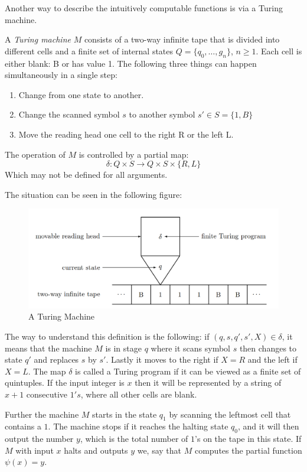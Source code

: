 \documentclass[../main.tex]{subfiles}
\begin{document}
Another way to describe the intuitively computable functions is via a Turing
machine. 
\begin{defi}
	A \textit{Turing machine} $M$ consists of a two-way infinite tape that
	is divided into different cells and a finite set of internal states $Q=\{
	q_0,\ldots, g_n\}$, $n\geq 1$. Each cell  is either blank: B or has
	value 1.
	The following three things can happen simultaneously in a single
	step:
	\begin{enumerate}
		\item Change from one state to another.
		\item Change the scanned symbol $s$ to another symbol
			$s'\in S=\{1,B\}$
		\item Move the reading head one cell to the right R or the left
			L.
	\end{enumerate}
	The operation of $M$ is controlled by a partial map:
	$$\delta:Q\times S\rightarrow Q\times S\times\{R,L\}$$
	Which may not be defined for all arguments.
\end{defi}
The situation can be seen in the following figure:
\begin{center}
	\begin{figure}[h]
\includegraphics[width=\textwidth]{Turnig.png}
\caption{A Turing Machine}
\end{figure}
\end{center}

The way to understand this definition is the following: if
$(q,s,q',s',X)\in\delta$, it means that the machine $M$ is in stage $q$ where it
scans symbol $s$ then changes to state $q'$ and replaces $s$ by $s'$. Lastly it
moves to the right if $X=R$ and the left if $X=L$. The map $\delta$ is called a
Turing program if it can be viewed as a finite set of quintuples. If the input
integer is $x$ then it will be represented by a string of $x+1$ consecutive
$1's$, where all other cells are blank.

Further the machine $M$ starts in the state $q_1$ by scanning the leftmost cell
that contains a $1$. The machine stops if it reaches the halting state $q_0$,
and it will then output the number $y$, which is the total number of $1$'s on
the tape in this state. If $M$ with input $x$ halts and outputs $y$ we,
say that $M$ computes the partial function $\psi(x)=y$.
\end{document}
